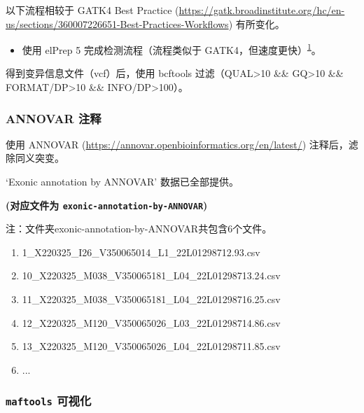 \documentclass[
]{article}
\providecommand{\tightlist}{%
  \setlength{\itemsep}{0pt}\setlength{\parskip}{0pt}}
\begin{document}
以下流程相较于 GATK4 Best Practice (\url{https://gatk.broadinstitute.org/hc/en-us/sections/360007226651-Best-Practices-Workflows}) 有所变化。

\begin{itemize}
\tightlist
\item
  使用 elPrep 5 完成检测流程（流程类似于 GATK4，但速度更快）\textsuperscript{\protect\hyperlink{ref-MultithreadedV2021}{1}}。
\end{itemize}

得到变异信息文件（vcf）后，使用 bcftools 过滤（QUAL\textgreater10 \&\& GQ\textgreater10 \&\& FORMAT/DP\textgreater10 \&\& INFO/DP\textgreater100）。

\hypertarget{annovar-res}{%
\subsubsection{ANNOVAR 注释}\label{annovar-res}}

使用 ANNOVAR (\url{https://annovar.openbioinformatics.org/en/latest/}) 注释后，滤除同义突变。

`Exonic annotation by ANNOVAR' 数据已全部提供。

\textbf{(对应文件为 \texttt{exonic-annotation-by-ANNOVAR})}

\begin{center}\begin{tcolorbox}[colback=gray!10, colframe=gray!50, width=0.9\linewidth, arc=1mm, boxrule=0.5pt]注：文件夹exonic-annotation-by-ANNOVAR共包含6个文件。

\begin{enumerate}\tightlist
\item 1\_X220325\_I26\_V350065014\_L1\_22L01298712.93.csv
\item 10\_X220325\_M038\_V350065181\_L04\_22L01298713.24.csv
\item 11\_X220325\_M038\_V350065181\_L04\_22L01298716.25.csv
\item 12\_X220325\_M120\_V350065026\_L03\_22L01298714.86.csv
\item 13\_X220325\_M120\_V350065026\_L04\_22L01298711.85.csv
\item ...
\end{enumerate}\end{tcolorbox}
\end{center}

\hypertarget{maftools-ux53efux89c6ux5316}{%
\subsubsection{\texorpdfstring{\texttt{maftools} 可视化}{maftools 可视化}}\label{maftools-ux53efux89c6ux5316}}
\end{document}
